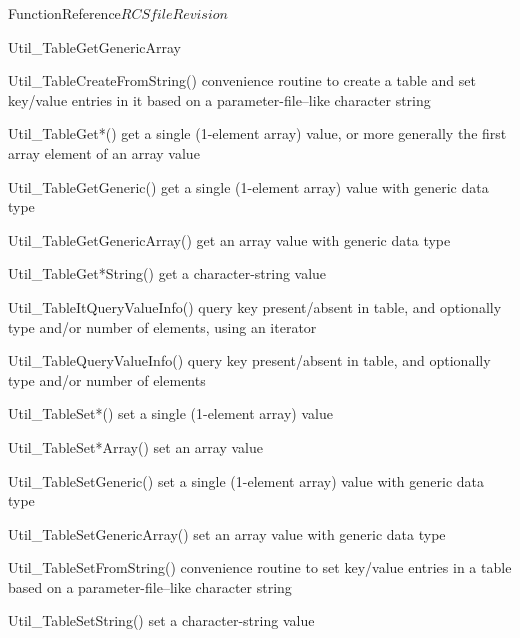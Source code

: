 \begin{cactuspart}{FunctionReference}{$RCSfile$}{$Revision$}
\begin{FunctionDescription}{Util\_TableGetGenericArray}
\begin{SeeAlsoSection}
\begin{SeeAlso}{Util\_TableCreateFromString()}
convenience routine to create a table and set key/value entries
in it based on a parameter-file--like character string
\end{SeeAlso}
\begin{SeeAlso}{Util\_TableGet*()}
get a single (1-element array) value,
or more generally the first array element of an array value
\end{SeeAlso}
\begin{SeeAlso}{Util\_TableGetGeneric()}
get a single (1-element array) value with generic data type
\end{SeeAlso}
\begin{SeeAlso}{Util\_TableGetGenericArray()}
get an array value with generic data type
\end{SeeAlso}
\begin{SeeAlso}{Util\_TableGet*String()}
get a character-string value
\end{SeeAlso}
\begin{SeeAlso}{Util\_TableItQueryValueInfo()}
query key present/absent in table, and optionally type and/or number
of elements, using an iterator
\end{SeeAlso}
\begin{SeeAlso}{Util\_TableQueryValueInfo()}
query key present/absent in table, and optionally type and/or number
of elements
\end{SeeAlso}
\begin{SeeAlso}{Util\_TableSet*()}
set a single (1-element array) value
\end{SeeAlso}
\begin{SeeAlso}{Util\_TableSet*Array()}
set an array value
\end{SeeAlso}
\begin{SeeAlso}{Util\_TableSetGeneric()}
set a single (1-element array) value with generic data type
\end{SeeAlso}
\begin{SeeAlso}{Util\_TableSetGenericArray()}
set an array value with generic data type
\end{SeeAlso}
\begin{SeeAlso}{Util\_TableSetFromString()}
convenience routine to set key/value entries in a table based on a
parameter-file--like character string
\end{SeeAlso}
\begin{SeeAlso}{Util\_TableSetString()}
set a character-string value
\end{SeeAlso}
\end{SeeAlsoSection}


\end{FunctionDescription}
\end{cactuspart}
